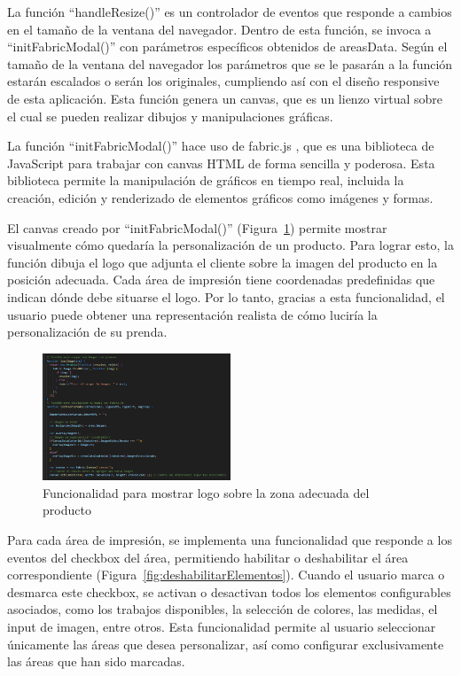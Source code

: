 \documentclass[12pt]{article}
\begin{document}
La función ``handleResize()'' es un controlador de eventos que responde a cambios en el tamaño de la ventana del navegador. 
Dentro de esta función, se invoca a ``initFabricModal()'' con parámetros específicos obtenidos de areasData. Según el tamaño de la ventana del navegador
los parámetros que se le pasarán a la función estarán escalados o serán los originales, cumpliendo así con el diseño responsive de esta aplicación. 
Esta función genera un canvas, que es un lienzo virtual sobre el cual se pueden realizar dibujos y manipulaciones gráficas.

La función ``initFabricModal()'' hace uso de fabric.js \cite{fabric.js}, que es una biblioteca de JavaScript 
para trabajar con canvas HTML de forma sencilla y poderosa. Esta biblioteca permite la manipulación de gráficos 
en tiempo real, incluida la creación, edición y renderizado de elementos gráficos como imágenes y formas.

El canvas creado por ``initFabricModal()'' (Figura~\ref{fig:pintarLogo}) permite mostrar visualmente cómo quedaría la personalización de un producto. Para lograr esto, la 
función dibuja el logo que adjunta el cliente sobre la imagen del producto en la posición adecuada. Cada área de impresión tiene coordenadas 
predefinidas que indican dónde debe situarse el logo. Por lo tanto, gracias a esta funcionalidad, el usuario puede obtener una representación 
realista de cómo luciría la personalización de su prenda.

\begin{figure}[ht]
    \centering
    \includegraphics[width=0.5\textwidth]{imagenesUS3-modal/FuncionalidadEspecialImagen.png}
    \caption{\label{fig:pintarLogo} Funcionalidad para mostrar logo sobre la zona adecuada del producto}
    \vspace{\fill}
\end{figure}

Para cada área de impresión, se implementa una funcionalidad que responde a los eventos del checkbox del área, permitiendo habilitar o deshabilitar 
el área correspondiente (Figura~\ref{fig:deshabilitarElementos}). Cuando el usuario marca o desmarca este checkbox, se activan o desactivan todos los elementos configurables asociados, 
como los trabajos disponibles, la selección de colores, las medidas, el input de imagen, entre otros. Esta funcionalidad permite al usuario seleccionar
únicamente las áreas que desea personalizar, así como configurar exclusivamente las áreas que han sido marcadas.
\end{document}
